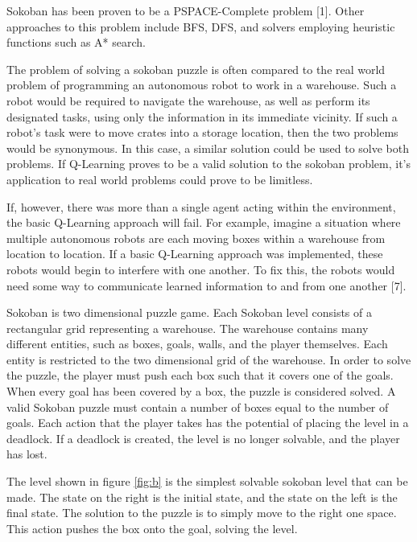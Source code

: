 \documentclass[times, 10pt,twocolumn]{article}
\begin{document}

Sokoban has been proven to be a PSPACE-Complete problem [1]. Other approaches to this problem include BFS, DFS, and solvers employing heuristic functions such as A* search.

The problem of solving a sokoban puzzle is often compared to the real world problem of programming an autonomous robot to work in a warehouse. Such a robot would be required to navigate the warehouse, as well as perform its designated tasks, using only the information in its immediate vicinity. If such a robot’s task were to move crates into a storage location, then the two problems would be synonymous. In this case, a similar solution could be used to solve both problems. If Q-Learning proves to be a valid solution to the sokoban problem, it’s application to real world problems could prove to be limitless.

If, however, there was more than a single agent acting within the environment, the basic Q-Learning approach will fail. For example, imagine a situation where multiple autonomous robots are each moving boxes within a warehouse from location to location. If a basic Q-Learning approach was implemented, these robots would begin to interfere with one another. To fix this, the robots would need some way to communicate learned information to and from one another [7].


Sokoban is two dimensional puzzle game. Each Sokoban level consists of a rectangular grid representing a warehouse. The warehouse contains many different entities, such as boxes, goals, walls, and the player themselves. Each entity is restricted to the two dimensional grid of the warehouse. In order to solve the puzzle, the player must push each box such that it covers one of the goals. When every goal has been covered by a box, the puzzle is considered solved. A valid Sokoban puzzle must contain a number of boxes equal to the number of goals. Each action that the player takes has the potential of placing the level in a deadlock. If a deadlock is created, the level is no longer solvable, and the player has lost.

The level shown in figure \ref{fig:b} is the simplest solvable sokoban level that can be made. The state on the right is the initial state, and the state on the left is the final state. The solution to the puzzle is to simply move to the right one space. This action pushes the box onto the goal, solving the level.
\end{document}

